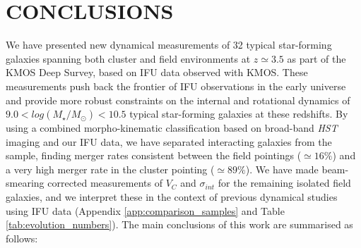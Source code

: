 \documentclass[fleqn,usenatbib]{mnras}
\begin{document}
\section{CONCLUSIONS}\label{sec:conclusion}
We have presented new dynamical measurements of 32 typical star-forming galaxies spanning both cluster and field environments at $z\simeq3.5$ as part of the KMOS Deep Survey, based on IFU data observed with KMOS.
These measurements push back the frontier of IFU observations in the early universe and provide more robust constraints on the internal and rotational dynamics of $9.0 < log(M_{\star}/M_{\odot})< 10.5$ typical star-forming galaxies at these redshifts.
By using a combined morpho-kinematic classification based on broad-band {\em HST} imaging and our IFU data, we have separated interacting galaxies from the sample, finding merger rates consistent between the field pointings ($\simeq16\%$) and a very high merger rate in the cluster pointing ($\simeq89\%$).
We have made beam-smearing corrected measurements of $V_{C}$ and $\sigma_{int}$ for the remaining isolated field galaxies, and we interpret these in the context of previous dynamical studies using IFU data (Appendix \ref{app:comparison_samples} and Table \ref{tab:evolution_numbers}).
The main conclusions of this work are summarised as follows:
\end{document}
